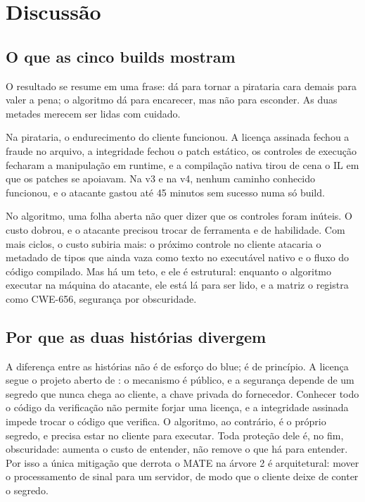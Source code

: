 \section{Discussão}
\label{sec:discussao}

\subsection{O que as cinco builds mostram}

O resultado se resume em uma frase: dá para tornar a pirataria cara demais para valer a pena; o algoritmo dá para encarecer, mas não para esconder. As duas metades merecem ser lidas com cuidado.

Na pirataria, o endurecimento do cliente funcionou. A licença assinada fechou a fraude no arquivo, a integridade fechou o patch estático, os controles de execução fecharam a manipulação em runtime, e a compilação nativa tirou de cena o IL em que os patches se apoiavam. Na v3 e na v4, nenhum caminho conhecido funcionou, e o atacante gastou até 45 minutos sem sucesso numa só build.

No algoritmo, uma folha aberta não quer dizer que os controles foram inúteis. O custo dobrou, e o atacante precisou trocar de ferramenta e de habilidade. Com mais ciclos, o custo subiria mais: o próximo controle no cliente atacaria o metadado de tipos que ainda vaza como texto no executável nativo e o fluxo do código compilado. Mas há um teto, e ele é estrutural: enquanto o algoritmo executar na máquina do atacante, ele está lá para ser lido, e a matriz o registra como CWE-656, segurança por obscuridade.

\subsection{Por que as duas histórias divergem}

A diferença entre as histórias não é de esforço do blue; é de princípio. A licença segue o projeto aberto de \textcite{saltzer1975}: o mecanismo é público, e a segurança depende de um segredo que nunca chega ao cliente, a chave privada do fornecedor. Conhecer todo o código da verificação não permite forjar uma licença, e a integridade assinada impede trocar o código que verifica. O algoritmo, ao contrário, é o próprio segredo, e precisa estar no cliente para executar. Toda proteção dele é, no fim, obscuridade: aumenta o custo de entender, não remove o que há para entender. Por isso a única mitigação que derrota o MATE na árvore 2 é arquitetural: mover o processamento de sinal para um servidor, de modo que o cliente deixe de conter o segredo.

